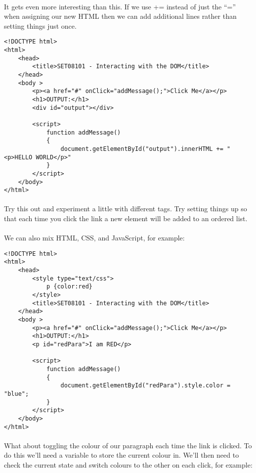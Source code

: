 \documentclass[10pt, a4paper, twosize]{article}
\begin{document}
\paragraph{} It gets even more interesting than this. If we use += instead of just the ``='' when assigning our new HTML then we can add additional lines rather than setting things just once. 

\begin{lstlisting}
<!DOCTYPE html>
<html>
    <head> 
        <title>SET08101 - Interacting with the DOM</title>
    </head>
    <body >
        <p><a href="#" onClick="addMessage();">Click Me</a></p>
        <h1>OUTPUT:</h1>
        <div id="output"></div>

        <script>
            function addMessage() 
            { 
                document.getElementById("output").innerHTML += "<p>HELLO WORLD</p>"
            }      
        </script>
    </body>
</html>
\end{lstlisting}


\paragraph{} Try this out and experiment a little with different tags. Try setting things up so that each time you click the link a new element will be added to an ordered list.

\paragraph{} We can also mix HTML, CSS, and JavaScript, for example:

\begin{lstlisting}
<!DOCTYPE html>
<html>
    <head>
        <style type="text/css">
            p {color:red}
        </style>
        <title>SET08101 - Interacting with the DOM</title>
    </head>
    <body >
        <p><a href="#" onClick="addMessage();">Click Me</a></p>
        <h1>OUTPUT:</h1>
        <p id="redPara">I am RED</p>

        <script>
            function addMessage() 
            { 
                document.getElementById("redPara").style.color = "blue";
            }      
        </script>
    </body>
</html>
\end{lstlisting}

\paragraph{} What about toggling the colour of our paragraph each time the link is clicked. To do this we'll need a variable to store the current colour in. We'll then need to check the current state and switch colours to the other on each click, for example:
\end{document}
